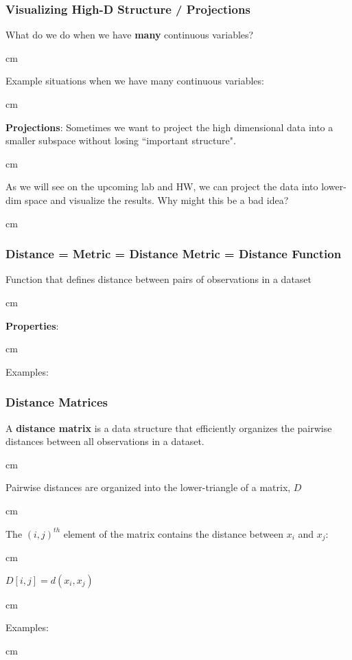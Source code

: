 \documentclass{beamer} %
\begin{document}
\begin{frame}\frametitle{Visualizing High-D Structure / Projections}
	\small
	
	What do we do when we have \textbf{many} continuous variables?
	
	 cm
	
	Example situations when we have many continuous variables:
	
	 cm
	
	\textbf{Projections}:  Sometimes we want to project the high dimensional data into a smaller subspace without losing ``important structure".
	
	 cm
	
	
	As we will see on the upcoming lab and HW, we can project the data into lower-dim space and visualize the results.  Why might this be a bad idea?
	
	 cm
	
\end{frame}




\begin{frame}\frametitle{Distance = Metric = Distance Metric = Distance Function}
	\small
	
	Function that defines distance between pairs of observations in a dataset
	
	 cm
	
	\textbf{Properties}:
	
	 cm
	
	Examples:  
	
\end{frame}


\begin{frame}\frametitle{Distance Matrices}
	\small
	
	A \textbf{distance matrix} is a data structure that efficiently organizes the pairwise distances between all observations in a dataset.
	
	 cm
	
	Pairwise distances are organized into the lower-triangle of a matrix, $D$
	
	 cm
	
	The $(i,j)^{th}$ element of the matrix contains the distance between $x_i$ and $x_j$:
	
	 cm
	
	$D[i,j] = d(x_i, x_j)$
	
	 cm
	
	Examples:
	
	
	
	 cm
	
	

	
\end{frame}
\end{document}
